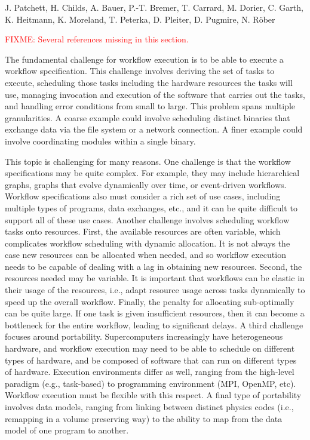 \license

 J. Patchett, H. Childs, A. Bauer, P.-T. Bremer, T. Carrard, M. Dorier, C. Garth, K. Heitmann, K. Moreland, T. Peterka, D. Pleiter, D. Pugmire, N. Röber

\textcolor{red}{FIXME: Several references missing in this section.}
\begin{refsection}

The fundamental challenge for workflow execution is to be able to execute a workflow specification.  This challenge involves deriving the set of tasks to execute, scheduling those tasks including the hardware resources the tasks will use, managing invocation and execution of the software that carries out the tasks, and handling error conditions from small to large.
This problem spans multiple granularities.  A coarse example could involve scheduling distinct binaries that exchange data via the file system or a network connection.  A finer example could involve coordinating modules within a single binary.

This topic is challenging for many reasons.
One challenge is that the workflow specifications may be quite complex.  For example, they may include hierarchical graphs, graphs that evolve dynamically over time, or event-driven workflows.  Workflow specifications also must consider a rich set of use cases, including multiple types of programs, data exchanges, etc., and it can be quite difficult to support all of these use cases.
Another challenge involves scheduling workflow tasks onto resources.  First, the available resources are often variable, which complicates workflow scheduling with dynamic allocation.  It is not always the case new resources can be allocated when needed, and so workflow execution needs to be capable of dealing with a lag in obtaining new resources.  Second, the resources needed may be variable.  It is important that workflows can be elastic in their usage of the resources, i.e., adapt resource usage across tasks dynamically to speed up the overall workflow.  Finally, the penalty for allocating sub-optimally can be quite large.  If one task is given insufficient resources, then it can become a bottleneck for the entire workflow, leading to significant delays.
A third challenge focuses around portability.  Supercomputers increasingly have heterogeneous hardware, and workflow execution may need to be able to schedule on different types of hardware, and be composed of software that can run on different types of hardware.  Execution environments differ as well, ranging from the high-level paradigm (e.g., task-based) to programming environment (MPI, OpenMP, etc).  Workflow execution must be flexible with this respect.  A final type of portability involves data models, ranging from linking between distinct physics codes (i.e., remapping in a volume preserving way) to the ability to map from the data model of one program to another.


\end{refsection}

